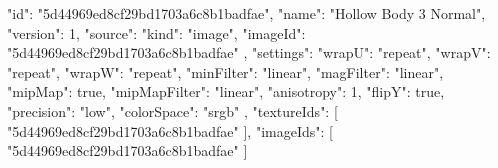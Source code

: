 {
  "id": "5d44969ed8cf29bd1703a6c8b1badfae",
  "name": "Hollow Body 3 Normal",
  "version": 1,
  "source": {
    "kind": "image",
    "imageId": "5d44969ed8cf29bd1703a6c8b1badfae"
  },
  "settings": {
    "wrapU": "repeat",
    "wrapV": "repeat",
    "wrapW": "repeat",
    "minFilter": "linear",
    "magFilter": "linear",
    "mipMap": true,
    "mipMapFilter": "linear",
    "anisotropy": 1,
    "flipY": true,
    "precision": "low",
    "colorSpace": "srgb"
  },
  "textureIds": [
    "5d44969ed8cf29bd1703a6c8b1badfae"
  ],
  "imageIds": [
    "5d44969ed8cf29bd1703a6c8b1badfae"
  ]
}

